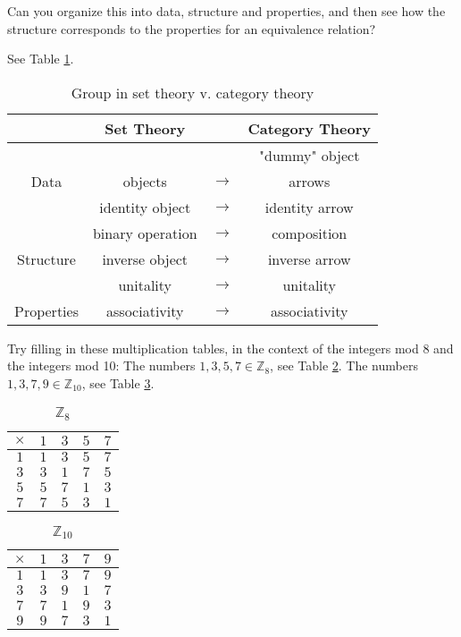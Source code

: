 \begin{ttta}
	Can you organize this into data, structure and properties, and then see
	how the structure corresponds to the properties for an equivalence relation?
\end{ttta}
See Table \ref{tbl:group}.
\begin{table}
	\centering
	\begin{tabular}{ c|ccc }
		\hline
		           & Set Theory       &               & Category Theory \\ \hline
		           &                  &               & "dummy" object  \\
		Data       & objects          & $\rightarrow$ & arrows          \\ \hline
		           & identity object  & $\rightarrow$ & identity arrow  \\
		           & binary operation & $\rightarrow$ & composition     \\
		Structure  & inverse object   & $\rightarrow$ & inverse arrow   \\ \hline
		           & unitality        & $\rightarrow$ & unitality       \\
		Properties & associativity    & $\rightarrow$ & associativity
		\\\hline
	\end{tabular}
	\caption{Group in set theory v. category theory}
	\label{tbl:group}
\end{table}
\begin{ttta}
	Try filling in these multiplication tables, in the context of the integers
	mod 8 and the integers mod 10:
	The numbers $1, 3, 5, 7\in \mathbb{Z}_8$, see Table \ref{tbl:z8}.
	The numbers $1, 3, 7, 9\in \mathbb{Z}_{10}$, see Table \ref{tbl:z10}.
\end{ttta}
\begin{table}
	\centering
	\begin{tabular}{c|cccc}
		$\times $ & $1$ & $3$ & $5$ & $7$ \\
		\hline
		$1$       & $1$ & $3$ & $5$ & $7$ \\
		$3$       & $3$ & $1$ & $7$ & $5$ \\
		$5$       & $5$ & $7$ & $1$ & $3$ \\
		$7$       & $7$ & $5$ & $3$ & $1$ \\
	\end{tabular}
	\caption{$\mathbb{Z}_8$}
	\label{tbl:z8}
\end{table}
\begin{table}
	\centering
	\begin{tabular}{c|cccc}
		$\times $ & $1$ & $3$ & $7$ & $9$ \\
		\hline
		$1$       & $1$ & $3$ & $7$ & $9$ \\
		$3$       & $3$ & $9$ & $1$ & $7$ \\
		$7$       & $7$ & $1$ & $9$ & $3$ \\
		$9$       & $9$ & $7$ & $3$ & $1$ \\
	\end{tabular}
	\caption{$\mathbb{Z}_{10}$}
	\label{tbl:z10}
\end{table}

